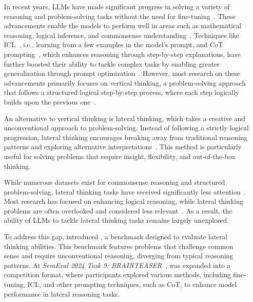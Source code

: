 In recent years, \acp{LLM} have made significant progress in solving a variety of reasoning and problem-solving tasks without the need for fine-tuning~\cite{radfordLanguageModelsAre2019}. These advancements enable the models to perform well in areas such as mathematical reasoning, logical inference, and commonsense understanding~\cite{panLogicLMEmpoweringLarge2023, qiaoReasoningLanguageModel2023, naveedComprehensiveOverviewLarge2024}. Techniques like \ac{ICL}~\cite{brownLanguageModelsAre2020}, i.e., learning from a few examples in the model's prompt, and \ac{CoT} prompting~\cite{weiChainofThoughtPromptingElicits2023}, which enhances reasoning through step-by-step explanations, have further boosted their ability to tackle complex tasks by enabling greater generalization through prompt optimization~\cite{brownLanguageModelsAre2020,weiChainofThoughtPromptingElicits2023}. However, most research on these advancements primarily focuses on vertical thinking, a problem-solving approach that follows a structured logical step-by-step process, where each step logically builds upon the previous one~\cite{jiangBRAINTEASERLateralThinking2023}.

An alternative to vertical thinking is lateral thinking, which takes a creative and unconventional approach to problem-solving. Instead of following a strictly logical progression, lateral thinking encourages breaking away from traditional reasoning patterns and exploring alternative interpretations~\cite{jiangBRAINTEASERLateralThinking2023, jiangSemEval2024Task92024}. This method is particularly useful for solving problems that require insight, flexibility, and out-of-the-box thinking.

While numerous datasets exist for commonsense reasoning and structured problem-solving, lateral thinking tasks have received significantly less attention~\cite{jiangBRAINTEASERLateralThinking2023, jiangSemEval2024Task92024}. Most research has focused on enhancing logical reasoning, while lateral thinking problems are often overlooked and considered less relevant~\cite{jiangBRAINTEASERLateralThinking2023, jiangSemEval2024Task92024}. As a result, the ability of \acp{LLM} to tackle lateral thinking tasks remains largely unexplored.

To address this gap, \textcite{jiangBRAINTEASERLateralThinking2023} introduced , a benchmark designed to evaluate lateral thinking abilities. This benchmark features problems that challenge common sense and require unconventional reasoning, diverging from typical reasoning patterns. At \textit{SemEval 2024 Task 9: BRAINTEASER}~\cite{jiangSemEval2024Task92024},  was expanded into a competition format, where participants explored various methods, including fine-tuning, \ac{ICL}, and other prompting techniques, such as \ac{CoT}, to enhance model performance in lateral reasoning tasks.


